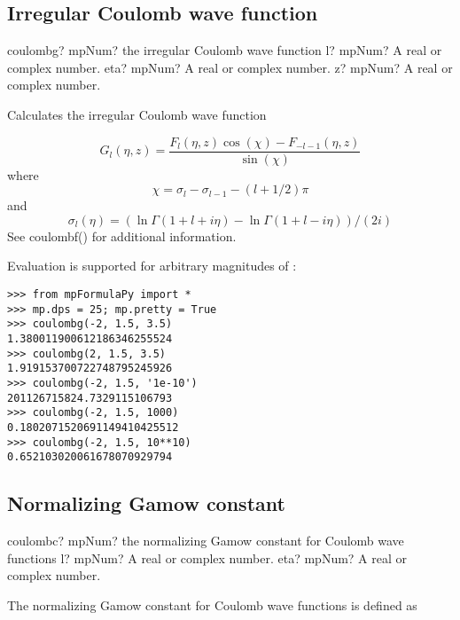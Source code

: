 \subsection{Irregular Coulomb wave function}

\begin{mpFunctionsExtract}
	\mpFunctionThree
	{coulombg? mpNum? the irregular Coulomb wave function}
	{l? mpNum? A real or complex number.}
	{eta? mpNum? A real or complex number.}
	{z? mpNum? A real or complex number.}		
\end{mpFunctionsExtract}


\vpara
Calculates the irregular Coulomb wave function

\begin{equation}
G_l(\eta, z) = \frac{F_l(\eta,z) \cos(\chi) - F_{-l-1}(\eta,z)}{\sin(\chi)}
\end{equation}
where
\begin{equation}
\chi=\sigma_l-\sigma_{l-1}-(l+1/2)\pi
\end{equation}
and
\begin{equation}
\sigma_l(\eta)=(\ln\Gamma(1+l+i\eta) - \ln\Gamma(1+l-i\eta))/(2i)
\end{equation}
See coulombf() for additional information.

Evaluation is supported for arbitrary magnitudes of :

\begin{lstlisting}
>>> from mpFormulaPy import *
>>> mp.dps = 25; mp.pretty = True
>>> coulombg(-2, 1.5, 3.5)
1.380011900612186346255524
>>> coulombg(2, 1.5, 3.5)
1.919153700722748795245926
>>> coulombg(-2, 1.5, '1e-10')
201126715824.7329115106793
>>> coulombg(-2, 1.5, 1000)
0.1802071520691149410425512
>>> coulombg(-2, 1.5, 10**10)
0.652103020061678070929794
\end{lstlisting}



\subsection{Normalizing Gamow constant}

\begin{mpFunctionsExtract}
	\mpFunctionTwo
	{coulombc? mpNum? the normalizing Gamow constant for Coulomb wave functions}
	{l? mpNum? A real or complex number.}
	{eta? mpNum? A real or complex number.}	
\end{mpFunctionsExtract}


The normalizing Gamow constant for Coulomb wave functions is defined as

